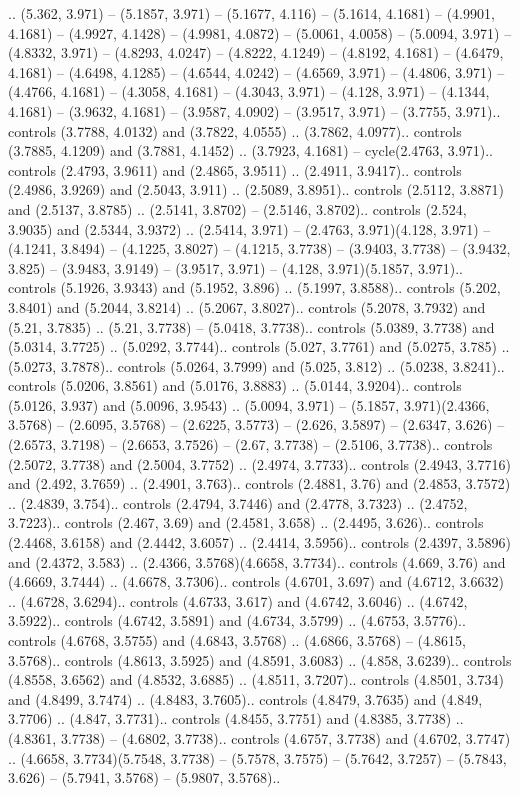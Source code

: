 .. (5.362, 3.971) -- (5.1857, 3.971) -- (5.1677, 4.116) -- (5.1614, 4.1681) -- (4.9901, 4.1681) -- (4.9927, 4.1428) -- (4.9981, 4.0872) -- (5.0061, 4.0058) -- (5.0094, 3.971) -- (4.8332, 3.971) -- (4.8293, 4.0247) -- (4.8222, 4.1249) -- (4.8192, 4.1681) -- (4.6479, 4.1681) -- (4.6498, 4.1285) -- (4.6544, 4.0242) -- (4.6569, 3.971) -- (4.4806, 3.971) -- (4.4766, 4.1681) -- (4.3058, 4.1681) -- (4.3043, 3.971) -- (4.128, 3.971) -- (4.1344, 4.1681) -- (3.9632, 4.1681) -- (3.9587, 4.0902) -- (3.9517, 3.971) -- (3.7755, 3.971).. controls (3.7788, 4.0132) and (3.7822, 4.0555) .. (3.7862, 4.0977).. controls (3.7885, 4.1209) and (3.7881, 4.1452) .. (3.7923, 4.1681) -- cycle(2.4763, 3.971).. controls (2.4793, 3.9611) and (2.4865, 3.9511) .. (2.4911, 3.9417).. controls (2.4986, 3.9269) and (2.5043, 3.911) .. (2.5089, 3.8951).. controls (2.5112, 3.8871) and (2.5137, 3.8785) .. (2.5141, 3.8702) -- (2.5146, 3.8702).. controls (2.524, 3.9035) and (2.5344, 3.9372) .. (2.5414, 3.971) -- (2.4763, 3.971)(4.128, 3.971) -- (4.1241, 3.8494) -- (4.1225, 3.8027) -- (4.1215, 3.7738) -- (3.9403, 3.7738) -- (3.9432, 3.825) -- (3.9483, 3.9149) -- (3.9517, 3.971) -- (4.128, 3.971)(5.1857, 3.971).. controls (5.1926, 3.9343) and (5.1952, 3.896) .. (5.1997, 3.8588).. controls (5.202, 3.8401) and (5.2044, 3.8214) .. (5.2067, 3.8027).. controls (5.2078, 3.7932) and (5.21, 3.7835) .. (5.21, 3.7738) -- (5.0418, 3.7738).. controls (5.0389, 3.7738) and (5.0314, 3.7725) .. (5.0292, 3.7744).. controls (5.027, 3.7761) and (5.0275, 3.785) .. (5.0273, 3.7878).. controls (5.0264, 3.7999) and (5.025, 3.812) .. (5.0238, 3.8241).. controls (5.0206, 3.8561) and (5.0176, 3.8883) .. (5.0144, 3.9204).. controls (5.0126, 3.937) and (5.0096, 3.9543) .. (5.0094, 3.971) -- (5.1857, 3.971)(2.4366, 3.5768) -- (2.6095, 3.5768) -- (2.6225, 3.5773) -- (2.626, 3.5897) -- (2.6347, 3.626) -- (2.6573, 3.7198) -- (2.6653, 3.7526) -- (2.67, 3.7738) -- (2.5106, 3.7738).. controls (2.5072, 3.7738) and (2.5004, 3.7752) .. (2.4974, 3.7733).. controls (2.4943, 3.7716) and (2.492, 3.7659) .. (2.4901, 3.763).. controls (2.4881, 3.76) and (2.4853, 3.7572) .. (2.4839, 3.754).. controls (2.4794, 3.7446) and (2.4778, 3.7323) .. (2.4752, 3.7223).. controls (2.467, 3.69) and (2.4581, 3.658) .. (2.4495, 3.626).. controls (2.4468, 3.6158) and (2.4442, 3.6057) .. (2.4414, 3.5956).. controls (2.4397, 3.5896) and (2.4372, 3.583) .. (2.4366, 3.5768)(4.6658, 3.7734).. controls (4.669, 3.76) and (4.6669, 3.7444) .. (4.6678, 3.7306).. controls (4.6701, 3.697) and (4.6712, 3.6632) .. (4.6728, 3.6294).. controls (4.6733, 3.617) and (4.6742, 3.6046) .. (4.6742, 3.5922).. controls (4.6742, 3.5891) and (4.6734, 3.5799) .. (4.6753, 3.5776).. controls (4.6768, 3.5755) and (4.6843, 3.5768) .. (4.6866, 3.5768) -- (4.8615, 3.5768).. controls (4.8613, 3.5925) and (4.8591, 3.6083) .. (4.858, 3.6239).. controls (4.8558, 3.6562) and (4.8532, 3.6885) .. (4.8511, 3.7207).. controls (4.8501, 3.734) and (4.8499, 3.7474) .. (4.8483, 3.7605).. controls (4.8479, 3.7635) and (4.849, 3.7706) .. (4.847, 3.7731).. controls (4.8455, 3.7751) and (4.8385, 3.7738) .. (4.8361, 3.7738) -- (4.6802, 3.7738).. controls (4.6757, 3.7738) and (4.6702, 3.7747) .. (4.6658, 3.7734)(5.7548, 3.7738) -- (5.7578, 3.7575) -- (5.7642, 3.7257) -- (5.7843, 3.626) -- (5.7941, 3.5768) -- (5.9807, 3.5768).. 